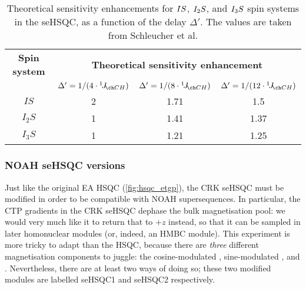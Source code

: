 \begin{table}[!ht]
    \begin{tabular}{cccc}
        \toprule
        \textbf{Spin system} & \multicolumn{3}{c}{\textbf{Theoretical sensitivity enhancement}} \\
        \cmidrule(lr){2-4}
                             & $\Delta' = 1 / (4 \cdot \oneJ{CH})$ & $\Delta' = 1 / (8 \cdot \oneJ{CH})$ & $\Delta' = 1 / (12 \cdot \oneJ{CH})$ \\
        \midrule
        $IS$   & 2 & 1.71 & 1.5  \\
        $I_2S$ & 1 & 1.41 & 1.37 \\
        $I_3S$ & 1 & 1.21 & 1.25 \\
        \bottomrule
    \end{tabular}
    \caption[Theoretical sensitivity enhancements in the seHSQC]{
        Theoretical sensitivity enhancements for $IS\/$, $I_2S\/$, and $I_3S\/$ spin systems in the seHSQC, as a function of the delay $\Delta'$.
        The values are taken from Schleucher et al.\autocite{Schleucher1994JBNMR}
    }
    \label{tbl:sehsqc_theory}
\end{table}


\subsubsection{NOAH seHSQC versions}

Just like the original EA HSQC (\cref{fig:hsqc_etgp}), the CRK seHSQC must be modified in order to be compatible with NOAH supersequences.
In particular, the CTP gradients in the CRK seHSQC dephase the bulk  magnetisation pool: we would very much like it to return that to $+z$ instead, so that it can be sampled in later homonuclear modules (or, indeed, an HMBC module).
This experiment is more tricky to adapt than the HSQC, because there are \textit{three} different magnetisation components to juggle: the cosine-modulated , sine-modulated , and .
Nevertheless, there are at least two ways of doing so; these two modified modules are labelled seHSQC1 and seHSQC2 respectively.

